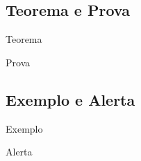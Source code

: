 \documentclass[aspect ratio = 169]{beamer}
\begin{document}
\subsection{Teorema e Prova}

\begin{frame}{Teorema}
    
\end{frame}

\begin{frame}{Prova}
    
\end{frame}

\subsection{Exemplo e Alerta}

\begin{frame}{Exemplo}
    
\end{frame}

\begin{frame}{Alerta}
    
\end{frame}
\end{document}
